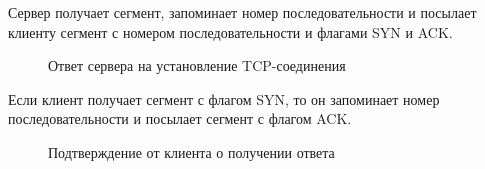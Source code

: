 \documentclass[a4paper, 14pt,russian]{article}
\begin{document}
		Сервер получает сегмент, запоминает номер последовательности и посылает клиенту сегмент с номером последовательности и флагами SYN и ACK.
		\newpage
		\begin{figure}[h!]
			\caption{Ответ сервера на установление TCP-соединения}
			\label{img:tcp_syn_ack}
		\end{figure}
		Если клиент получает сегмент с флагом SYN, то он запоминает номер последовательности и посылает сегмент с флагом ACK.
		\begin{figure}[h!]
			\caption{Подтверждение от клиента о получении ответа}
			\label{img:tcp_ack}
		\end{figure}
	
\end{document}
